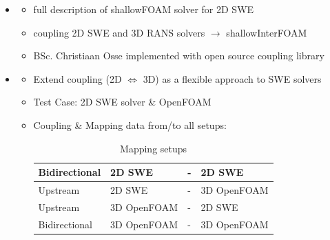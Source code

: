 \begin{frame}

\begin{multicols}{2}
\begin{itemize}
\item<1->[]    
 \begin{itemize}
   \setlength\itemsep{2em}
  \item  full description of shallowFOAM  solver for 2D SWE \cite{mintgen}
 \item  coupling 2D SWE and 3D RANS solvers $\rightarrow$ shallowInterFOAM \cite{mintgen}
 \item BSc. Christiaan Osse implemented \cite{mintgen} with open source coupling library
 \end{itemize}
    
 \vfill\columnbreak

\item<2->[]
 \begin{itemize}
    \setlength\itemsep{2em}

 \item<3-> Extend \cite{mintgen} coupling (2D $\Longleftrightarrow$ 3D) as a flexible approach to SWE solvers
 \item<4-> Test Case: 2D SWE solver \& OpenFOAM 
 \item<5-> Coupling \& Mapping data from/to all setups: \vspace{0.4cm}
\begin{table}[]
\begin{tabular}{|llll|}
\hline
Bidirectional & 2D SWE       & - & 2D SWE       \\ \hline
Upstream      & 2D SWE       & - & 3D OpenFOAM \\ \hline
Upstream      & 3D OpenFOAM & - & 2D SWE       \\ \hline
Bidirectional & 3D OpenFOAM & - & 3D OpenFOAM \\ \hline
\end{tabular}
\caption{Mapping setups}
\label{table:1}
\end{table}
\end{itemize}
\end{itemize}
\end{multicols}


\end{frame}


